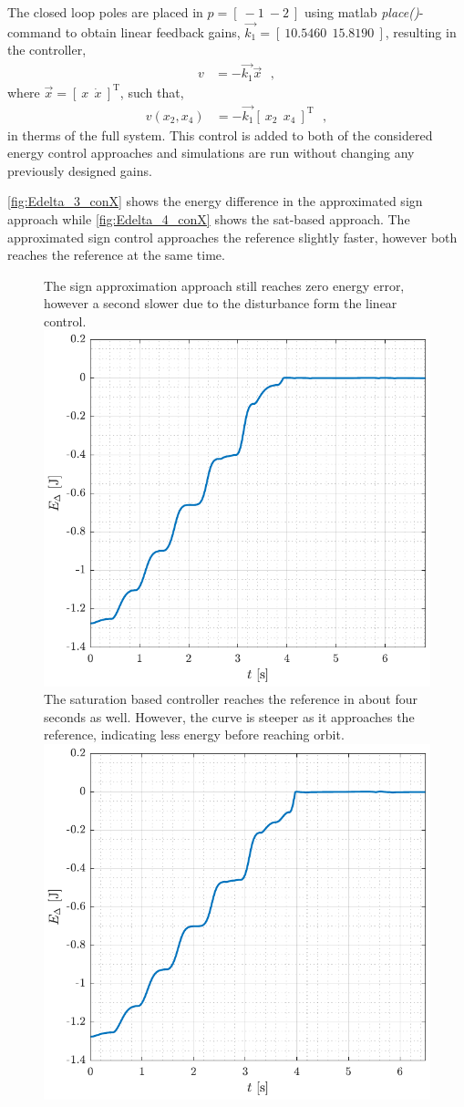 %
The closed loop poles are placed in $p = [\ -1\ -2 \ ] $ using matlab \textit{place()}-command to obtain linear feedback gains, $\vec{k_1} = [\ 10.5460\ \ 15.8190\ ]$, resulting in the controller,
\begin{align}
  v &= -\vec{k_1} \vec{x} \ \ \ ,  \label{eq:linearFeedbackSimple} 
\end{align}
where $\vec{x} = [\ x\ \ \dot{x}\ ]^\mathrm{T}$, such that,
\begin{align}
  v(x_2,x_4) &= -\vec{k_1}  [\ x_2\ \ x_4\ ]^\mathrm{T} \ \ \ ,    \label{eq:linearFeedbackSimple2} 
\end{align}
in therms of the full system. This control is added to both of the considered energy control approaches and simulations are run without changing any previously designed gains.

\autoref{fig:Edelta_3_conX} shows the energy difference in the approximated sign approach while \autoref{fig:Edelta_4_conX} shows the sat-based approach. The approximated sign control approaches the reference slightly faster, however both reaches the reference at the same time.
%
\begin{figure}[H]
  \hspace{-10pt}
  \captionbox
  {
    The sign approximation approach still reaches zero energy error, however a second slower due to the disturbance form the linear control.
    \label{fig:Edelta_3_conX}
  }
  {
    \hspace{-1cm}
    \includegraphics[width=.46\textwidth]{figures/Edelta_3_conX}
  }
  \hspace{20pt}
  \captionbox 
  {
    The saturation based controller reaches the reference in about four seconds as well. However, the curve is steeper as it approaches the reference, indicating less energy before reaching orbit.
    \label{fig:Edelta_4_conX}
  }
  {
    \hspace{-1cm}
    \includegraphics[width=.46\textwidth]{figures/Edelta_4_conX}
  }  
\end{figure}
